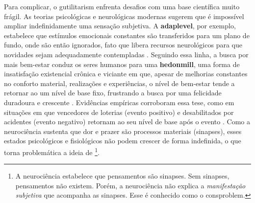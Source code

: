 \documentclass[./main.tex]{subfiles}
\begin{document}
\par Para complicar, o \gls{gutilitarism} enfrenta desafios com uma base científica muito frágil. As teorias psicológicas e neurológicas modernas sugerem que é impossível ampliar indefinidamente uma sensação subjetiva. A \textbf{\gls{adaplevel}}, por exemplo, estabelece que estímulos emocionais constantes são transferidos para um plano de fundo, onde são então ignorados, fato que libera recursos neurológicos para que novidades sejam adequadamente contempladas \cite{Edwards_2018}. Seguindo essa linha, a busca por mais bem-estar conduz os seres humanos para uma \textbf{\gls{hedonmill}}, uma forma de insatisfação existencial crônica e viciante em que, apesar de melhorias constantes no conforto material, realizações e experiências, o nível de bem-estar tende a retornar ao um nível de base fixo, frustrando a busca por uma felicidade duradoura e crescente \cite{Diener2009}. Evidências empíricas corroboram essa tese, como em situações em que vencedores de loterias (evento positivo) e desabilitados por acidentes (evento negativo) retornam ao seu nível de base após o evento \cite{Brickman_1978}. Como a neurociência sustenta que dor e prazer são processos materiais (sinapses), esses estados psicológicos e fisiológicos não podem crescer de forma indefinida, o que torna problemática a ideia de \footnote{A neurociência estabelece que pensamentos são sinapses. Sem sinapses, pensamentos não existem. Porém, a neurociência não explica a \textit{manifestação subjetiva} que acompanha as sinapses. Esse é conhecido como o \gls{consproblem}.}.
\end{document}
